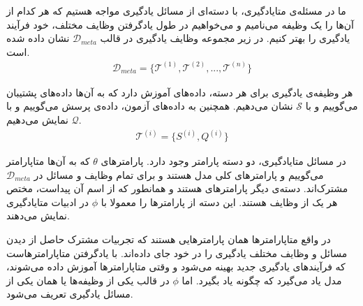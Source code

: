   ما در مسئله‌ی متایادگیری، با دسته‌ای از مسائل یادگیری مواجه هستیم که هر کدام از آن‌ها را یک وظیفه می‌نامیم و می‌خواهیم در طول یادگرفتن وظایف مختلف، خود فرآیند یادگیری را بهتر کنیم. در زیر مجموعه وظایف یادگیری در قالب 
  $\mathcal{D}_{meta}$
  نشان داده شده است.
  \begin{equation}
  	\begin{split}
  		\mathcal{D}_{meta} = \{\mathcal{T}^{(1)}, \mathcal{T}^{(2)} , ..., \mathcal{T}^{(n)}\}
  		\end{split}
  \end{equation}

هر وظیفه‌ی یادگیری برای هر دسته، داده‌های آموزش دارد که به آن‌ها داده‌‌های پشتیبان می‌گوییم و با 
$\mathcal{S}$
نشان می‌دهیم. همچنین به داده‌های آزمون، داده‌ی پرسش می‌گوییم و با 
$\mathcal{Q}$
نمایش می‌دهیم.
\begin{equation}
	\begin{split}
		\mathcal{T}^{(i)} = \{S^{(i)},Q^{(i)}\}
	\end{split}
\end{equation}

در مسائل متایادگیری، دو دسته پارامتر وجود دارد. پارامتر‌های 
$\theta$
که به آن‌ها متاپارامتر می‌گوییم و پارامتر‌‌های کلی مدل هستند و برای تمام وظایف و مسائل در 
  $\mathcal{D}_{meta}$
  مشترک‌اند. دسته‌ی دیگر پارامتر‌های 
  هستند و همانطور که از اسم آن پیداست، مختص هر یک از وظایف هستند. این دسته از پارامتر‌ها را معمولا با 
  $\phi$
  در ادبیات متایادگیری نمایش می‌دهند. 
  
  در واقع متاپارامتر‌ها همان پارامتر‌هایی هستند که تجربیات مشترک حاصل از دیدن مسائل و وظایف مختلف یادگیری را در خود جای داده‌اند. با یادگرفتن متاپارامترهاست که فرآیندهای یادگیری جدید بهینه می‌شود و وقتی متاپارامترها آموزش داده می‌شوند، مدل یاد می‌گیرد که چگونه یاد بگیرد. اما 
  $\phi$
در قالب یکی از وظیفه‌ها یا همان یکی از مسائل یادگیری تعریف می‌شود. 

